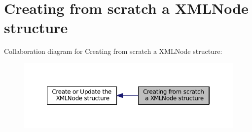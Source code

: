 \hypertarget{group__creation}{\section{Creating from scratch a X\-M\-L\-Node structure}
\label{group__creation}
}
Collaboration diagram for Creating from scratch a X\-M\-L\-Node structure\-:
\nopagebreak
\begin{figure}[H]
\begin{center}
\leavevmode
\includegraphics[width=350pt]{group__creation}
\end{center}
\end{figure}
